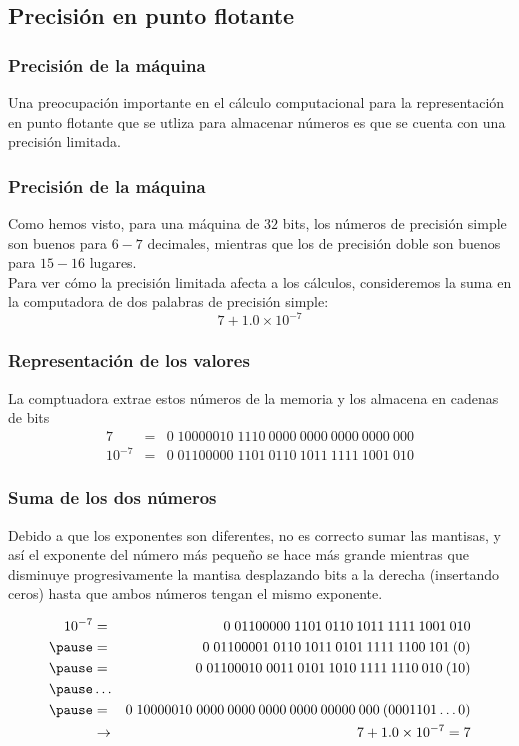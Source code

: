 \subsection{Precisión en punto flotante}
\begin{frame}
\frametitle{Precisión de la máquina}
Una preocupación importante en el cálculo computacional para la representación en punto flotante que se utliza para almacenar números es que se cuenta con una precisión limitada.
\end{frame}
\begin{frame}
\frametitle{Precisión de la máquina}
Como hemos visto, para una máquina de $32$ bits, los números de precisión simple son buenos para $6-7$ decimales, mientras que los de precisión doble son buenos para $15-16$ lugares.
\\
\bigskip
\pause
Para ver cómo la precisión limitada afecta a los cálculos, consideremos la suma en la computadora de dos palabras de precisión simple:
\\
\bigskip
\pause
\[ 7 + 1.0 \times 10^{-7} \]
\end{frame}
\begin{frame}
\frametitle{Representación de los valores}
La comptuadora extrae estos números de la memoria y los almacena en cadenas de bits
\fontsize{12}{12}\selectfont
\begin{eqnarray*}
7 &=& 0 \; 10000010 \; 1110 \: 0000 \: 0000 \: 0000 \: 0000 \: 000 \label{eq:ecuacion_01_10} \\
10^{-7} &=& 0 \; 01100000 \; 1101 \: 0110 \: 1011 \: 1111 \: 1001 \: 010 \label{eq:ecuacion_01_11}
\end{eqnarray*}
\end{frame}
\begin{frame}
\frametitle{Suma de los dos números}
Debido a que los exponentes son diferentes, no es correcto sumar las mantisas, y así el exponente del número más pequeño se hace más grande mientras que disminuye progresivamente la mantisa desplazando bits a la derecha (insertando ceros) hasta que ambos números tengan el mismo exponente.
\end{frame}
\begin{frame}
\fontsize{12}{12}\selectfont
\begin{eqnarray*}
10^{-7} &=& 0 \; 01100000 \; 1101 \: 0110 \: 1011 \: 1111 \: 1001 \: 010 \\ \pause
&=& 0 \; 01100001 \; 0110 \: 1011 \: 0101 \: 1111 \: 1100 \: 101 \: (0) \\ \pause
&=& 0 \; 01100010 \; 0011 \: 0101 \: 1010 \: 1111 \: 1110 \: 010 \: (10) \\ \pause
&\ldots& \\ \pause
&=& 0 \; 10000010 \; 0000 \: 0000 \: 0000 \: 0000 \: 00000 \: 000 \: (0001101 \ldots 0) \\
&\rightarrow& 7 +1.0 \times 10^{-7} = 7
\label{eq:ecuacion_01_12}
\end{eqnarray*}
\end{frame}
